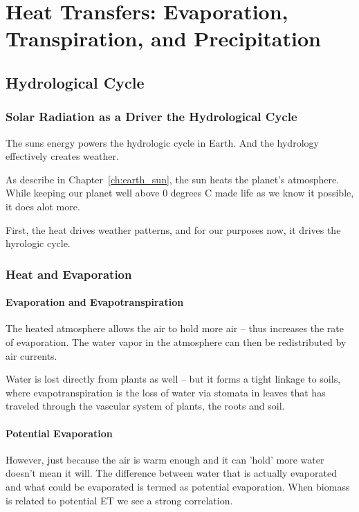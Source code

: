 \chapter{Heat Transfers: Evaporation, Transpiration, and Precipitation}\label{ch:evapotranspiration}

\section{Hydrological Cycle}

\subsection{Solar Radiation as a Driver the Hydrological Cycle}

The suns energy powers the hydrologic cycle in Earth. And the hydrology effectively creates weather. 

As describe in Chapter~\ref{ch:earth_sun}, the sun heats the planet's atmosphere. While keeping our planet well above 0 degrees C made life as we know it possible, it does alot more. 

First, the heat drives weather patterns, and for our purposes now, it drives the hyrologic cycle.  

\subsection{Heat and Evaporation}

\subsubsection{Evaporation and Evapotranspiration}

The heated atmosphere allows the air to hold more air -- thus increases the rate of evaporation. The water vapor in the atmosphere can then be redistributed by air currents.

Water is lost directly from plants as well -- but it forms a tight linkage to soils, where evapotranspiration is the loss of water via stomata in leaves that has traveled through the vascular system of plants, the roots and soil. 

\subsubsection{Potential Evaporation}

However, just because the air is warm enough and it can 'hold' more water doesn't mean it will. The difference between water that is actually evaporated and what could be evaporated is termed as potential evaporation. When biomass is related to potential ET we see a strong correlation. 


